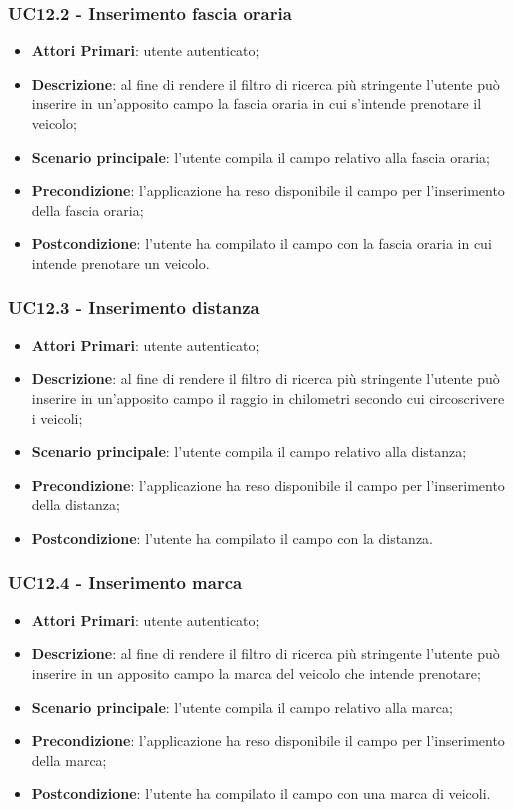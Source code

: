 \subsubsection{UC12.2 - Inserimento fascia oraria}
\begin{itemize}
	\item \textbf{Attori Primari}: utente autenticato;
	\item \textbf{Descrizione}: al fine di rendere il filtro di ricerca più stringente l'utente può inserire in un'apposito campo la fascia oraria in cui s'intende prenotare il veicolo;
	\item \textbf{Scenario principale}: l'utente compila il campo relativo alla fascia oraria;	
	\item \textbf{Precondizione}: l'applicazione ha reso disponibile il campo per l'inserimento della fascia oraria;
	\item \textbf{Postcondizione}: l'utente ha compilato il campo con la fascia oraria in cui intende prenotare un veicolo.	
\end{itemize}

\subsubsection{UC12.3 - Inserimento distanza}
\begin{itemize}
	\item \textbf{Attori Primari}: utente autenticato;
	\item \textbf{Descrizione}: al fine di rendere il filtro di ricerca più stringente l'utente può inserire in un'apposito campo il raggio in chilometri secondo cui circoscrivere i veicoli;
	\item \textbf{Scenario principale}: l'utente compila il campo relativo alla distanza;	
	\item \textbf{Precondizione}: l'applicazione ha reso disponibile il campo per l'inserimento della distanza;
	\item \textbf{Postcondizione}: l'utente ha compilato il campo con la distanza.	
\end{itemize}

\subsubsection{UC12.4 - Inserimento marca}
\begin{itemize}
	\item \textbf{Attori Primari}: utente autenticato;
	\item \textbf{Descrizione}: al fine di rendere il filtro di ricerca più stringente l'utente può inserire in un apposito campo la marca del veicolo che intende prenotare;
	\item \textbf{Scenario principale}: l'utente compila il campo relativo alla marca;	
	\item \textbf{Precondizione}: l'applicazione ha reso disponibile il campo per l'inserimento della marca;
	\item \textbf{Postcondizione}: l'utente ha compilato il campo con una marca di veicoli.	
\end{itemize}

